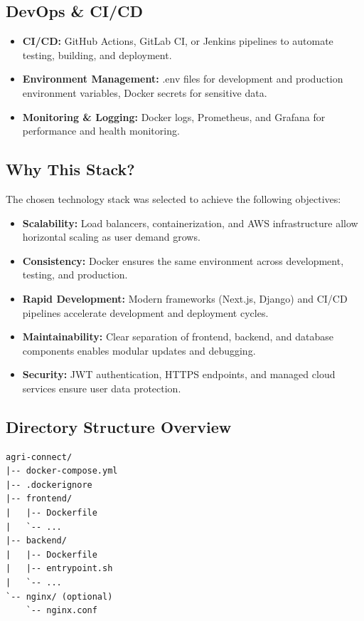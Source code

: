 \documentclass[12pt,a4paper]{article}
\begin{document}
\subsection{DevOps \& CI/CD}
\begin{itemize}
    \item \textbf{CI/CD:} GitHub Actions, GitLab CI, or Jenkins pipelines to automate testing, building, and deployment.
    \item \textbf{Environment Management:} .env files for development and production environment variables, Docker secrets for sensitive data.
    \item \textbf{Monitoring \& Logging:} Docker logs, Prometheus, and Grafana for performance and health monitoring.
\end{itemize}

\subsection{Why This Stack?}
The chosen technology stack was selected to achieve the following objectives:
\begin{itemize}
    \item \textbf{Scalability:} Load balancers, containerization, and AWS infrastructure allow horizontal scaling as user demand grows.
    \item \textbf{Consistency:} Docker ensures the same environment across development, testing, and production.
    \item \textbf{Rapid Development:} Modern frameworks (Next.js, Django) and CI/CD pipelines accelerate development and deployment cycles.
    \item \textbf{Maintainability:} Clear separation of frontend, backend, and database components enables modular updates and debugging.
    \item \textbf{Security:} JWT authentication, HTTPS endpoints, and managed cloud services ensure user data protection.
\end{itemize}

\subsection{Directory Structure Overview}
\begin{verbatim}
agri-connect/
|-- docker-compose.yml
|-- .dockerignore
|-- frontend/
|   |-- Dockerfile
|   `-- ...
|-- backend/
|   |-- Dockerfile
|   |-- entrypoint.sh
|   `-- ...
`-- nginx/ (optional)
    `-- nginx.conf
\end{verbatim}
\end{document}
